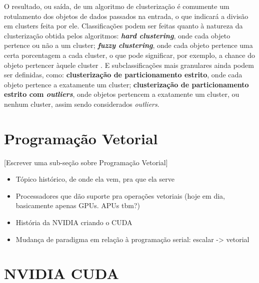 \documentclass[12pt, %
openright, 
oneside, %
a4paper,    %
brazil]{facom-ufu-abntex2}
\begin{document}

O resultado, ou saída, de um algoritmo de clusterização é comumente um rotulamento dos objetos de dados passados na entrada, o que indicará a divisão em clusters feita por ele. Classificações podem ser feitas quanto à natureza da clusterização obtida pelos algoritmos: \textbf{\textit{hard clustering}}, onde cada objeto pertence ou não a um cluster; \textbf{\textit{fuzzy clustering}}, onde cada objeto pertence uma certa porcentagem a cada cluster, o que pode significar, por exemplo, a chance do objeto pertencer àquele cluster \cite{FuzzyClusteringSurvey}. E subclassificações mais granulares ainda podem ser definidas, como: \textbf{clusterização de particionamento estrito}, onde cada objeto pertence a exatamente um cluster; \textbf{clusterização de particionamento estrito com \textit{outliers}}, onde objetos pertencem a exatamente um cluster, ou nenhum cluster, assim sendo considerados \textit{outliers}.




\section{Programação Vetorial}


[Escrever uma sub-seção sobre Programação Vetorial]

\begin{itemize}
  \item Tópico histórico, de onde ela vem, pra que ela serve
  \item Processadores que dão suporte pra operações vetoriais (hoje em dia, basicamente apenas GPUs. APUs tbm?)
  \item História da NVIDIA criando o CUDA
  \item Mudança de paradigma em relação à programação serial: escalar -> vetorial
\end{itemize}




\section{NVIDIA CUDA}
\end{document}
